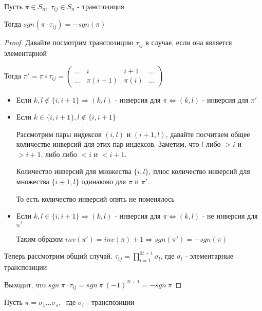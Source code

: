 \begin{theorem-non}
    Пусть $\pi \in S_n, \; \tau_{ij} \in S_n$ - транспозиция
    
    Тогда $sgn(\pi \cdot \tau_{ij}) = -sgn(\pi)$

    \begin{proof}
       Давайте посмотрим транспозицию $\tau_{ij}$ в случае, если она является элементарной 
       
       Тогда $\pi' = \pi \circ \tau_{ij} = \begin{pmatrix}
           \dots & i & i + 1 & \dots \\
           \dots & \pi(i + 1) & \pi(i) & \dots
       \end{pmatrix}$

       \begin{itemize}
            \item Если $k, l \notin \{i, i+1\} \Longrightarrow (k,l)$ - инверсия для $\pi 
                \Longleftrightarrow (k,l)$ - инверсия для $\pi'$ 
            \item Если $k \in \{i, i+1\}, l \notin \{i, i+1\}$

                Рассмотрим пары индексов $(i, l)$ и $(i+1, l)$, давайте посчитаем общее количестве инверсий для этих 
                пар индексов. Заметим, что $l$ либо $ > i$ и $ > i+ 1$, либо либо $ < i$ и $ < i+ 1$.

                Количество инверсий для множества $\{i,l\}$, плюс количество инверсий для множества $\{i+1, l\}$ одинаково для $\pi$ и $\pi'$.

                То есть количество инверсий опять не поменялось 
            \item Если $k, l \in \{i, i+1\} \Longrightarrow (k,l)$ - инверсия для $\pi \Longleftrightarrow 
            (k,l)$ - не инверсия для $\pi'$

            Таким образом $inv(\pi') = inv(\pi) \pm 1 \Longrightarrow sgn(\pi') = - sgn(\pi)$
        \end{itemize}
       
        Теперь рассмотрим общий случай. $\tau_{ij} = \prod\limits_{l=1}^{2t+1} \sigma_l$, где $\sigma_l$ - элементарные транспозиции

        Выходит, что $sgn \ \pi \cdot \tau_{ij} = sgn \ \pi \ (-1)^{2t+1} = -sgn \ \pi$
    \end{proof}
\end{theorem-non}

\follow \; Пусть $\pi = \sigma_1 \dots \sigma_s, \;$ где $\sigma_i$ - транспозиции

